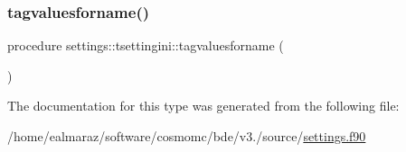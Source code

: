 \mbox{\label{structsettings_1_1tsettingini_aafb75b35735adcb40184e2a0d26583c7}} 
\subsubsection{\texorpdfstring{tagvaluesforname()}{tagvaluesforname()}}
{\footnotesize\ttfamily procedure settings\+::tsettingini\+::tagvaluesforname (\begin{DoxyParamCaption}{ }\end{DoxyParamCaption})}



The documentation for this type was generated from the following file\+:\begin{DoxyCompactItemize}
\item 
/home/ealmaraz/software/cosmomc/bde/v3./source/\mbox{\hyperlink{settings_8f90}{settings.\+f90}}\end{DoxyCompactItemize}
